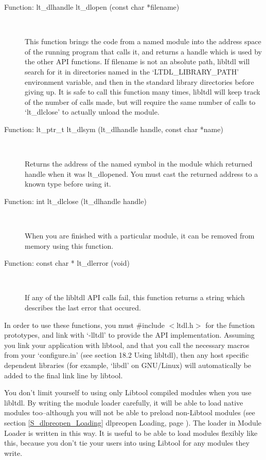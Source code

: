 \begin{description}
\item[Function: lt\_{}dlhandle lt\_{}dlopen (const char *filename)]
\

    This function brings the code from a named module into the address space of the running program that calls it, and returns a handle which is used by the other API functions. If filename is not an absolute path, libltdl will search for it in directories named in the `LTDL\_{}LIBRARY\_{}PATH' environment variable, and then in the standard library directories before giving up. It is safe to call this function many times, libltdl will keep track of the number of calls made, but will require the same number of calls to `lt\_{}dlclose' to actually unload the module. 

\item[Function: lt\_{}ptr\_{}t lt\_{}dlsym (lt\_{}dlhandle handle, const char *name)]
\

    Returns the address of the named symbol in the module which returned handle when it was lt\_{}dlopened. You must cast the returned address to a known type before using it. 

\item[Function: int lt\_{}dlclose (lt\_{}dlhandle handle)]
\

    When you are finished with a particular module, it can be removed from memory using this function. 

\item[Function: const char * lt\_{}dlerror (void)]
\

    If any of the libltdl API calls fail, this function returns a string which describes the last error that occured. 
\end{description}

In order to use these functions, you must \#include $<$ltdl.h$>$ for the function prototypes, and link with `-lltdl' to provide the API implementation. Assuming you link your application with libtool, and that you call the necessary macros from your `configure.in' (see section 18.2 Using libltdl), then any host specific dependent libraries (for example, `libdl' on GNU/Linux) will automatically be added to the final link line by libtool.

You don't limit yourself to using only Libtool compiled modules when you use 
libltdl. By writing the module loader carefully, it will be able to load 
native modules too--although you will not be able to preload non-Libtool 
modules (see section \ref{S_dlpreopen_Loading} dlpreopen Loading, page \pageref{S_dlpreopen_Loading}). The loader in Module Loader is written in this way. It is useful to be able to load modules flexibly like this, because you don't tie your users into using Libtool for any modules they write.

